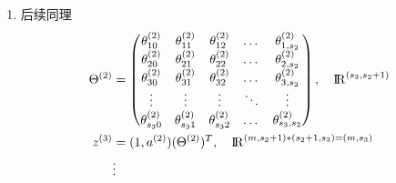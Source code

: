 \begin{enumerate}
\item 后续同理 \\
\begin{equation}\begin{aligned}
	\Theta^{(2)} &= 
		\left(\begin{matrix}
			\theta_{10}^{(2)} & \theta_{11}^{(2)} & \theta_{12}^{(2)} & \dots & \theta_{1,s_2}^{(2)} \\
			\theta_{20}^{(2)} & \theta_{21}^{(2)} & \theta_{22}^{(2)} & \dots & \theta_{2,s_2}^{(2)} \\
			\theta_{30}^{(2)} & \theta_{31}^{(2)} & \theta_{32}^{(2)} & \dots & \theta_{3,s_2}^{(2)} \\
			\vdots    & \vdots    & \vdots    & \ddots & \vdots   \\
			\theta_{s_{3}0}^{(2)} & \theta_{s_{3}1}^{(2)} & \theta_{s_{3}2}^{(2)} & \dots & \theta_{s_{3},s_{2}}^{(2)}
		\end{matrix}\right), \quad {\rm I\!R}^{(s_{3},s_2+1)}\\
	z^{(3)} &= (1, a^{(2)}) (\Theta^{(2)})^T, \quad {\rm I\!R}^{(m,s_2+1) * (s_2+1, s_3)=(m,s_3)} \\
	& \vdots \\
\end{aligned} \end{equation}


\end{enumerate}
